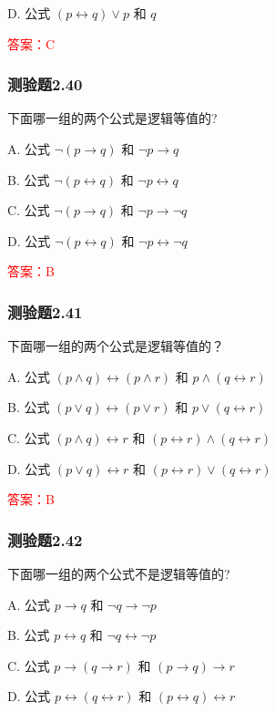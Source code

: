 \documentclass[UTF8, heading=true]{ctexart}
\begin{document}
D. 公式 $(p \leftrightarrow q) \vee p$ 和 $q$

\textcolor{red}{答案：C}

\subsubsection{测验题2.40}

下面哪一组的两个公式是逻辑等值的?

A. 公式 $\neg(p \rightarrow q)$ 和 $\neg p \rightarrow q$

B. 公式 $\neg(p \leftrightarrow q)$ 和 $\neg p \leftrightarrow q$

C. 公式 $\neg(p \rightarrow q)$ 和 $\neg p \rightarrow \neg q$

D. 公式 $\neg(p \leftrightarrow q)$ 和 $\neg p \leftrightarrow \neg q$

\textcolor{red}{答案：B}



\subsubsection{测验题2.41}

下面哪一组的两个公式是逻辑等值的？

A. 公式 $(p \wedge q) \leftrightarrow(p \wedge r)$ 和 $p \wedge(q \leftrightarrow r)$

B. 公式 $(p \vee q) \leftrightarrow(p \vee r)$ 和 $p \vee(q \leftrightarrow r)$

C. 公式 $(p \wedge q) \leftrightarrow r$ 和 $(p \leftrightarrow r) \wedge(q \leftrightarrow r)$

D. 公式 $(p \vee q) \leftrightarrow r$ 和 $(p \leftrightarrow r) \vee(q \leftrightarrow r)$

\textcolor{red}{答案：B}

\subsubsection{测验题2.42}

下面哪一组的两个公式不是逻辑等值的?

A. 公式 $p \rightarrow q$ 和 $\neg q \rightarrow \neg p$

B.  公式 $p \leftrightarrow q$ 和 $\neg q \leftrightarrow \neg p$

C. 公式 $p \rightarrow(q \rightarrow r)$ 和 $(p \rightarrow q) \rightarrow r$

D. 公式 $p \leftrightarrow(q \leftrightarrow r)$ 和 $(p \leftrightarrow q) \leftrightarrow r$
\end{document}
